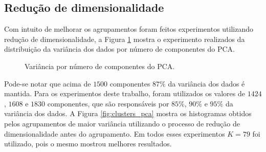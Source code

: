 \documentclass[conference]{IEEEtran}
\begin{document}
\subsection{Redução de dimensionalidade}

Com intuito de melhorar os agrupamentos foram feitos experimentos utilizando redução de dimensionalidade, a Figura \ref{fig:var_comp} mostra o experimento realizados da distribuição da variância dos dados por número de componentes do PCA.

\begin{figure}[!h]
	\centering
	{
	}
	\caption{\small Variância por número de componentes do PCA.}
	\label{fig:var_comp}
\end{figure}

Pode-se notar que acima de $1500$ componentes $87\%$  da variância dos dados é mantida. Para os experimentos deste trabalho, foram utilizados os valores de $1424$, $1608$ e $1830$ componentes, que são responsáveis por $85\%$, $90\%$ e $95\%$ da variância dos dados. A Figura \ref{fig:clusters_pca} mostra os histogramas obtidos pelos agrupamentos de maior variância utilizando o processo de redução de dimensionalidade antes do agrupamento. Em todos esses experimentos $K = 79$ foi utilizado, pois o mesmo mostrou melhores resultados.
\end{document}
